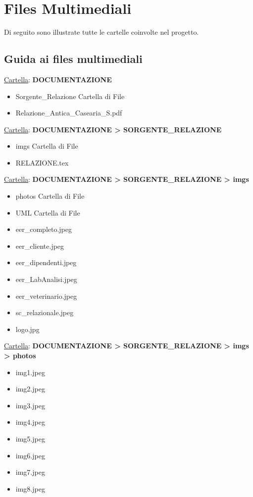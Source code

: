 \documentclass[12pt]{report}
\begin{document}
\begin{figure}[H]
\end{figure}


\chapter{Files Multimediali}
Di seguito sono illustrate tutte le cartelle coinvolte nel progetto. 
\section{Guida ai files multimediali}
\underline{Cartella}: \textbf{DOCUMENTAZIONE}
\begin{itemize}
\item Sorgente\_Relazione		\hspace{26mm} Cartella di File
\item Relazione\_Antica\_Casearia\_S.pdf
\end{itemize}
\underline{Cartella}: \textbf{DOCUMENTAZIONE > SORGENTE\_RELAZIONE}
\begin{itemize}
\item imgs		\hspace{53mm} Cartella di File
\item RELAZIONE.tex
\end{itemize}
\underline{Cartella}: \textbf{DOCUMENTAZIONE > SORGENTE\_RELAZIONE > imgs}
\begin{itemize}
\item photos        \hspace{49mm} Cartella di File
\item UML		    \hspace{52mm} Cartella di File
\item eer\_completo.jpeg
\item eer\_cliente.jpeg
\item eer\_dipendenti.jpeg
\item eer\_LabAnalisi.jpeg
\item eer\_veterinario.jpeg
\item sc\_relazionale.jpeg
\item logo.jpg
\end{itemize}
\underline{Cartella}: \textbf{DOCUMENTAZIONE > SORGENTE\_RELAZIONE > imgs > photos}
\begin{itemize}
\item img1.jpeg
\item img2.jpeg
\item img3.jpeg
\item img4.jpeg
\item img5.jpeg
\item img6.jpeg
\item img7.jpeg
\item img8.jpeg
\end{itemize}
\end{document}
